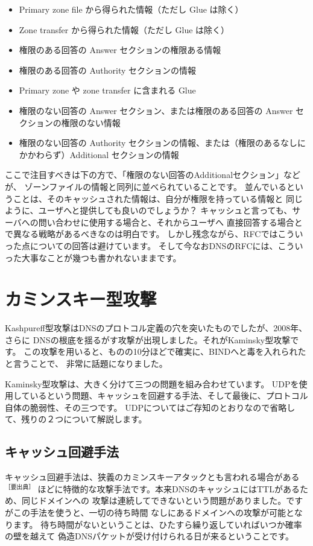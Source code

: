 \begin{itemize}
  \item Primary zone file から得られた情報（ただし Glue は除く）
  \item Zone transfer から得られた情報（ただし Glue は除く）
  \item 権限のある回答の Answer セクションの権限ある情報
  \item 権限のある回答の Authority セクションの情報
  \item Primary zone や zone transfer に含まれる Glue
  \item 権限のない回答の Answer セクション、または権限のある回答の Answer セクションの権限のない情報
  \item 権限のない回答の Authority セクションの情報、または（権限のあるなしにかかわらず）Additional セクションの情報
\end{itemize}

ここで注目すべきは下の方で、「権限のない回答のAdditionalセクション」などが、
ゾーンファイルの情報と同列に並べられていることです。
並んでいるということは、そのキャッシュされた情報は、自分が権限を持っている情報と
同じように、ユーザへと提供しても良いのでしょうか？
キャッシュと言っても、サーバへの問い合わせに使用する場合と、それからユーザへ
直接回答する場合とで異なる戦略があるべきなのは明白です。
しかし残念ながら、RFCではこういった点についての回答は避けています。
そして今なおDNSのRFCには、こういった大事なことが幾つも書かれないままです。


\section{カミンスキー型攻撃}
Kashpureff型攻撃はDNSのプロトコル定義の穴を突いたものでしたが、2008年、さらに
DNSの根底を揺るがす攻撃が出現しました。それがKaminsky型攻撃です。
この攻撃を用いると、ものの10分ほどで確実に、BINDへと毒を入れられたと言うことで、
非常に話題になりました。

Kaminsky型攻撃は、大きく分けて三つの問題を組み合わせています。
UDPを使用しているという問題、キャッシュを回避する手法、そして最後に、プロトコル
自体の脆弱性、その三つです。
UDPについてはご存知のとおりなので省略して、残りの２つについて解説します。

\subsection{キャッシュ回避手法}
キャッシュ回避手法は、狭義のカミンスキーアタックとも言われる場合がある$^{［要出典］}$
ほどに特徴的な攻撃手法です。本来DNSのキャッシュにはTTLがあるため、同じドメインへの
攻撃は連続してできないという問題がありました。ですがこの手法を使うと、一切の待ち時間
なしにあるドメインへの攻撃が可能となります。
待ち時間がないということは、ひたすら繰り返していればいつか確率の壁を越えて
偽造DNSパケットが受け付けられる日が来るということです。


